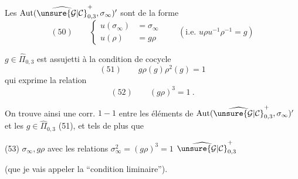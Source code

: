 
Les \unsure{$\in$}  $\operatorname{Aut}(\widehat{\unsure{\mathcal{G}|\mathcal{C}}}_{0,3}^{+},\sigma_\infty)'$ sont de la forme
\[
(50)\qquad
\left\{\begin{aligned}
u(\sigma_\infty)&=\sigma_\infty\\
u(\rho)&=g\rho
\end{aligned}\right.
\qquad (\text{i.e. }u\rho u^{-1}\rho^{-1}=g)
\]


$g\in\widehat{\Pi}_{0,3}$  est assujetti à la condition de cocycle
\[
(51)\qquad \boxed{g\rho(g)\rho^2(g)=1}
\]
qui exprime la relation
\[
(52)\qquad (g\rho)^3=1\ .
\]

On trouve ainsi une corr. $1-1$ entre les éléments de $\operatorname{Aut}(\widehat{\unsure{\mathcal{G}|\mathcal{C}}}_{0,3}^{+},\sigma_\infty)'$ et les $g\in\widehat{\Pi}_{0,3}$  (51), et tels de plus que

(53) $\sigma_\infty,g\rho$ avec les relations $\sigma_\infty^2=(g\rho)^3=1$  $\widehat{\unsure{\mathcal{G}|\mathcal{C}}}_{0,3}^{+}$


(que je vais appeler la ``condition liminaire'').


